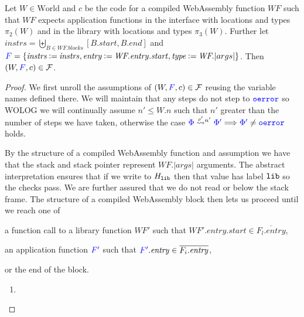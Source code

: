 \begin{lemma} \label{appendix:wasm:lr:ftlr-functions}
  Let $W \in \mathrm{World}$ and $c$ be the code for a compiled WebAssembly function
  $\textit{WF}$ such that $\textit{WF}$ expects application functions in the
  interface with locations and types $\pi_2(W)$ and in the library with locations
  and types $\pi_3(W)$.
  Further let $\mathit{instrs} = \biguplus_{B \in \textit{WF}.\mathit{blocks}}
  [B.start, B.end]$ and ${\color{blue}{F}} = \{ \mathit{instrs} \mathbin{\vcentcolon=} \mathit{instrs},
  \mathit{entry} \mathbin{\vcentcolon=} \textit{WF}.\mathit{entry}.\mathit{start}, \mathit{type}
  \mathbin{\vcentcolon=} \textit{WF}.|args|\}$.
  Then $(W, {\color{blue}{F}}, c) \in \mathcal{F}$.
\end{lemma}
\begin{proof}
  We first unroll the assumptions of $(W, {\color{blue}{F}}, c) \in \mathcal{F}$ reusing the
  variable names defined there.
  We will maintain that any steps do not step to ${\color{blue}{\mathtt{oerror}}}$ so WOLOG we will
  continually assume $n' \leq W.n$ such that $n'$ greater than the number of steps
  we have taken, otherwise the case ${\color{blue}{\Phi}} \mathrel{\accentset{\rho'}{\leadsto}^{n'}} {\color{blue}{\Phi'}}
  \Longrightarrow {\color{blue}{\Phi'}} \neq {\color{blue}{\mathtt{oerror}}}$ holds.

  By the structure of a compiled WebAssembly function and assumption we have
  that the stack and stack pointer represent $\textit{WF}.|args|$ arguments.
  The abstract interpretation ensures that if we write to $H_{\mathtt{lib}}$ then
  that value has label $\mathtt{lib}$ so the checks pass.
  We are further assured that we do not read or below the stack frame.
  The structure of a compiled WebAssembly block then lets us proceed until we
  reach one of
  \begin{enumerate*}
  \item a function call to a library function $\textit{WF}'$ such that $\textit{WF}'.\mathit{entry}.\mathit{start} \in \overline{F_l.\mathit{entry}}$,
  \item an application function ${\color{blue}{F'}}$ such that ${\color{blue}{F'}}.\mathit{entry} \in \overline{F_i.\mathit{entry}}$,
  \item or the end of the block.
  \end{enumerate*}

  \begin{enumerate}
  \item


\end{enumerate}
\end{proof}
